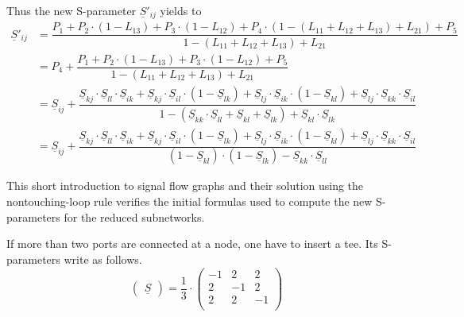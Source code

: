 \documentclass[10pt]{report}
\begin{document}
Thus the new S-parameter $\underline{S}'_{ij}$ yields to
\begin{equation}
\begin{split}
\underline{S}'_{ij}
&= \dfrac{P_{1} + P_{2}\cdot\left(1 - L_{13}\right) + P_{3}\cdot\left(1 - L_{12}\right) + P_{4}\cdot\left(1 - \left(L_{11} + L_{12} + L_{13}\right) + L_{21}\right) + P_{5}}{1 - \left(L_{11} + L_{12} + L_{13}\right) + L_{21}}\\
&= P_{4} + \dfrac{P_{1} + P_{2}\cdot\left(1 - L_{13}\right) + P_{3}\cdot\left(1 - L_{12}\right) + P_{5}}{1 - \left(L_{11} + L_{12} + L_{13}\right) + L_{21}}\\
&= \underline{S}_{ij} + \dfrac{\underline{S}_{kj}\cdot \underline{S}_{ll}\cdot \underline{S}_{ik} + \underline{S}_{kj}\cdot \underline{S}_{il} \cdot\left(1 - \underline{S}_{lk}\right) + \underline{S}_{lj}\cdot \underline{S}_{ik}\cdot\left(1 - \underline{S}_{kl}\right) + \underline{S}_{lj}\cdot \underline{S}_{kk}\cdot \underline{S}_{il}}{1 - \left(\underline{S}_{kk}\cdot \underline{S}_{ll} + \underline{S}_{kl} + \underline{S}_{lk}\right) + \underline{S}_{kl}\cdot \underline{S}_{lk}}\\
&= \underline{S}_{ij} + \dfrac{\underline{S}_{kj}\cdot \underline{S}_{ll}\cdot \underline{S}_{ik} + \underline{S}_{kj}\cdot \underline{S}_{il} \cdot\left(1 - \underline{S}_{lk}\right) + \underline{S}_{lj}\cdot \underline{S}_{ik}\cdot\left(1 - \underline{S}_{kl}\right) + \underline{S}_{lj}\cdot \underline{S}_{kk}\cdot \underline{S}_{il}}{\left(1 - \underline{S}_{kl}\right)\cdot \left(1 - \underline{S}_{lk}\right) - \underline{S}_{kk}\cdot \underline{S}_{ll}}
\end{split}
\end{equation}

This short introduction to signal flow graphs and their solution using
the nontouching-loop rule verifies the initial formulas used to
compute the new S-parameters for the reduced subnetworks.

\addvspace{12pt}

If more than two ports are connected at a node, one have to insert a
tee.  Its S-parameters write as follows.
\begin{equation}
\begin{pmatrix}
\underline{S}
\end{pmatrix}
= \dfrac{1}{3}\cdot
\begin{pmatrix}
-1 &  2 &  2\\
 2 & -1 &  2\\
 2 &  2 & -1\\
\end{pmatrix}
\end{equation}
\end{document}
